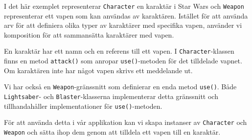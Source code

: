 I det här exemplet representerar \texttt{Character} en karaktär i Star
Wars och \texttt{Weapon} representerar ett vapen som kan användas av
karaktären. Istället för att använda arv för att definiera olika typer
av karaktärer med specifika vapen, använder vi komposition för att
sammansätta karaktärer med vapen.

En karaktär har ett namn och en referens till ett vapen. I
\texttt{Character}-klassen finns en metod \texttt{attack()} som anropar
\texttt{use()}-metoden för det tilldelade vapnet. Om karaktären inte har
något vapen skrivs ett meddelande ut.

Vi har också en \texttt{Weapon}-gränssnitt som definierar en enda metod
\texttt{use()}. Både \texttt{Lightsaber}- och \texttt{Blaster}-klasserna
implementerar detta gränssnitt och tillhandahåller implementationer för
\texttt{use()}-metoden.

För att använda detta i vår applikation kan vi skapa instanser av
\texttt{Character} och \texttt{Weapon} och sätta ihop dem genom att
tilldela ett vapen till en karaktär.

\hypertarget{cb5}{}
\begin{Shaded}
\begin{Highlighting}[]
 \OperatorTok{\{}
   \OperatorTok{(}\OperatorTok{[]}\OperatorTok{)} \OperatorTok{\{}
\OperatorTok{=}  \OperatorTok{();}
\OperatorTok{=}  \OperatorTok{(}\OperatorTok{,}\OperatorTok{);}
\OperatorTok{();} 

\OperatorTok{=}  \OperatorTok{();}
\OperatorTok{=}  \OperatorTok{(}\OperatorTok{,}\OperatorTok{);}
\OperatorTok{();} 

\OperatorTok{=}  \OperatorTok{(}\OperatorTok{,} \OperatorTok{);}
\OperatorTok{();} 
\OperatorTok{\}}
\OperatorTok{\}}
\end{Highlighting}
\end{Shaded}

